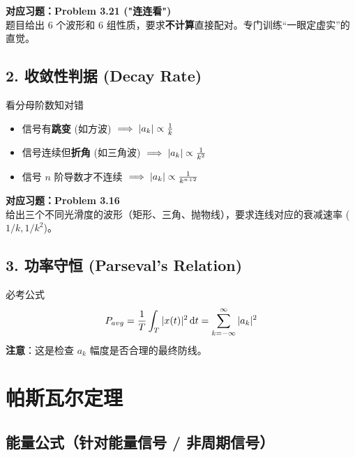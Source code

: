 \begin{bookbox}{}
    \textbf{对应习题：Problem 3.21 ("连连看")}
    \\ 题目给出 6 个波形和 6 组性质，要求\textbf{不计算}直接配对。专门训练“一眼定虚实”的直觉。
\end{bookbox}

\subsection*{2. 收敛性判据 (Decay Rate)}

\begin{alertbox}{看分母阶数知对错}
    \begin{itemize}
        \item 信号有\textbf{跳变} (如方波) $\implies |a_k| \propto \frac{1}{k}$
        \item 信号连续但\textbf{折角} (如三角波) $\implies |a_k| \propto \frac{1}{k^2}$
        \item 信号 $n$ 阶导数才不连续 $\implies |a_k| \propto \frac{1}{k^{n+2}}$
    \end{itemize}
\end{alertbox}

\begin{bookbox}{}
    \textbf{对应习题：Problem 3.16}
    \\ 给出三个不同光滑度的波形（矩形、三角、抛物线），要求连线对应的衰减速率 ($1/k, 1/k^2$)。
\end{bookbox}

\subsection*{3. 功率守恒 (Parseval's Relation)}

\begin{alertbox}{必考公式}
    \[ P_{avg} = \frac{1}{T} \int_T |x(t)|^2 \,\mathrm{d} t = \sum_{k=-\infty}^{\infty} |a_k|^2 \]
    \textbf{注意}：这是检查 $a_k$ 幅度是否合理的最终防线。
\end{alertbox}

\newpage


\section{帕斯瓦尔定理}
\subsection{能量公式（针对能量信号 / 非周期信号）}

